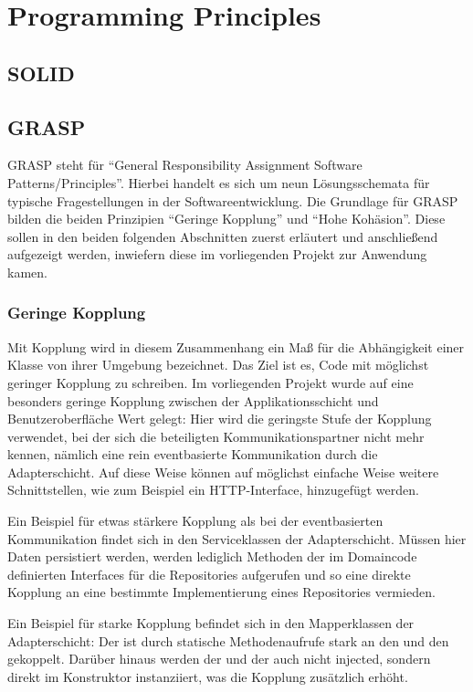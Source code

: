 \chapter{Programming Principles}

\section{SOLID}

\section{GRASP}
GRASP steht für \enquote{General Responsibility Assignment Software Patterns/Principles}. Hierbei handelt es sich um neun Lösungsschemata für typische Fragestellungen in der Softwareentwicklung. Die Grundlage für GRASP bilden die beiden Prinzipien \enquote{Geringe Kopplung} und \enquote{Hohe Kohäsion}. Diese sollen in den beiden folgenden Abschnitten zuerst erläutert und anschließend aufgezeigt werden, inwiefern diese im vorliegenden Projekt zur Anwendung kamen.

\subsection{Geringe Kopplung}
Mit Kopplung wird in diesem Zusammenhang ein Maß für die Abhängigkeit einer Klasse von ihrer Umgebung bezeichnet. Das Ziel ist es, Code mit möglichst geringer Kopplung zu schreiben. Im vorliegenden Projekt wurde auf eine besonders geringe Kopplung zwischen der Applikationsschicht und Benutzeroberfläche Wert gelegt: Hier wird die geringste Stufe der Kopplung verwendet, bei der sich die beteiligten Kommunikationspartner nicht mehr kennen, nämlich eine rein eventbasierte Kommunikation durch die Adapterschicht. Auf diese Weise können auf möglichst einfache Weise weitere Schnittstellen, wie zum Beispiel ein HTTP-Interface, hinzugefügt werden.

Ein Beispiel für etwas stärkere Kopplung als bei der eventbasierten Kommunikation findet sich in den Serviceklassen der Adapterschicht. Müssen hier Daten persistiert werden, werden lediglich Methoden der im Domaincode definierten Interfaces für die Repositories aufgerufen und so eine direkte Kopplung an eine bestimmte Implementierung eines Repositories vermieden.

Ein Beispiel für starke Kopplung befindet sich in den Mapperklassen der Adapterschicht: Der  ist durch statische Methodenaufrufe stark an den  und den  gekoppelt. Darüber hinaus werden der  und der  auch nicht injected, sondern direkt im Konstruktor instanziiert, was die Kopplung zusätzlich erhöht.

